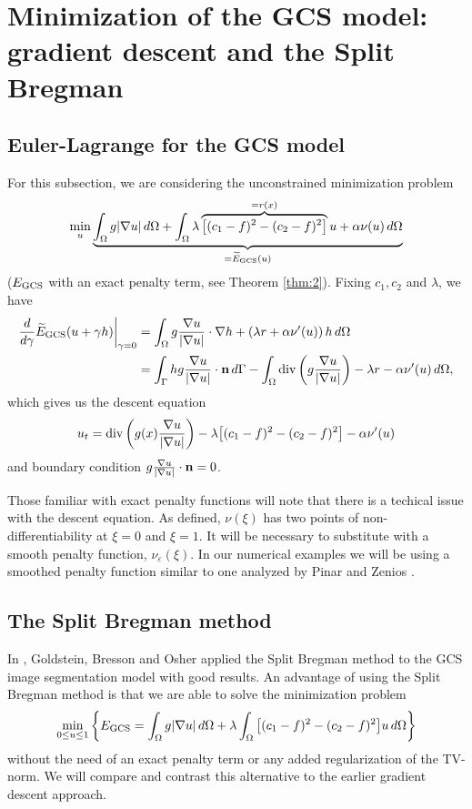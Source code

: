 \section{Minimization of the GCS model: gradient descent and the Split Bregman}
\subsection{Euler-Lagrange for the GCS model}
For this subsection, we are considering the unconstrained minimization problem 
\begin{align*}
\min_u \underbrace{\int_{\Omega } g\lvert\nabla u\rvert \,d\Omega 
+ \int_{\Omega} \lambda \overbrace{\big[ (c_1 - f)^2 - (c_2 - f)^2 \big]}^{=r(x)} u + \alpha \nu(u) \,d\Omega }_{=\widetilde E_{\textrm{GCS}}(u)}
\end{align*}
($E_\textrm{GCS}$ with an exact penalty term, see Theorem \ref{thm:2}).
Fixing $c_1, c_2$ and $\lambda$, we have
\begin{align*}
\frac{d}{d\gamma} \widetilde E_\textrm{GCS}(u + \gamma h)
\bigg\rvert_{\gamma = 0} 
&= \int_{\Omega} g \frac{\nabla u}{\lvert\nabla u\rvert} \cdot \nabla h
+ \left( \lambda r + \alpha \nu'(u) \right) h \,d\Omega 
\\
&= \int_{\Gamma} h g \frac{\nabla u}{\lvert\nabla u\rvert} \cdot \mathbf{n}  \, d \Gamma - \int_{\Omega } \operatorname{div}\left( g \frac{\nabla u}{\lvert\nabla u\rvert} \right) - \lambda r - \alpha \nu'(u) \,d\Omega ,
\end{align*}
which gives us the descent equation 
\begin{align*}
u_t = \operatorname{div}\left( g(x)  \frac{\nabla u}{\lvert\nabla u\rvert} \right) - \lambda\big[ (c_1 - f)^2 - (c_2 - f)^2 \big]  - \alpha \nu'(u)
\end{align*}
and boundary condition $g\frac{\nabla u}{\lvert\nabla u\rvert} \cdot \mathbf{n} = 0$. 

Those familiar with exact penalty functions will note that there is a techical issue with the descent equation. As defined, $\nu(\xi)$ has two points of non-differentiability at $\xi = 0$ and $\xi = 1$. It will be necessary to substitute with a smooth penalty function, $\nu_\varepsilon(\xi)$. In our numerical examples we will be using a smoothed penalty function similar to one analyzed by Pinar and Zenios \cite{pinar1994smoothing}.



\subsection{The Split Bregman method}
In \cite{goldstein2010geometric}, Goldstein, Bresson and Osher applied the Split Bregman method \cite{goldstein2009split} to the GCS image segmentation model with good results. An advantage of using the Split Bregman method is that we are able to solve the minimization problem 
\begin{align}
\min_{0 \leq u \leq 1} \left\{ E_\textrm{GCS}  
= \int_{\Omega } g\lvert\nabla u\rvert \,d\Omega 
+ \lambda \int_{\Omega} \big[ (c_1 - f)^2 - (c_2 - f)^2\big] u \,d\Omega
\right\}
\label{eq:egcs1}
\end{align}
without the need of an exact penalty term or any added regularization of the TV-norm. We will compare and contrast this alternative to the earlier gradient descent approach. 

